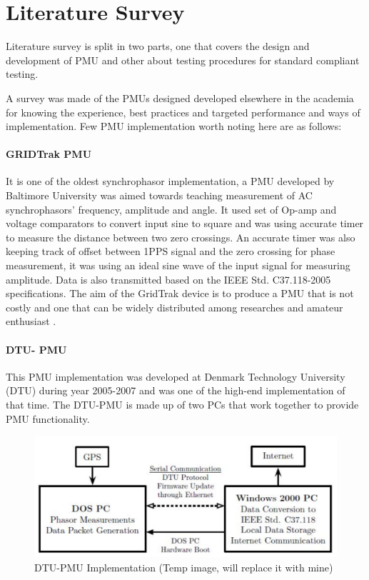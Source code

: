 \chapter{Literature Survey}
Literature survey is split in two parts, one that covers the design and development of PMU  and other about testing procedures for standard compliant testing.

A survey was made of the PMUs designed developed elsewhere in the academia for knowing the experience, best practices and targeted performance and ways of implementation. Few PMU implementation worth noting here are as follows:

\subsubsection{GRIDTrak PMU} It is one of the oldest synchrophasor implementation, a PMU developed by Baltimore University \cite{dotta2014teaching} was aimed towards teaching measurement of AC synchrophasors' frequency, amplitude and angle. It used set of Op-amp and voltage comparators to convert input sine to square and was using accurate timer to measure the distance between two zero crossings. An accurate timer was also keeping track of offset between 1PPS signal and the zero crossing for phase measurement, it was using an ideal sine wave of the input signal for measuring amplitude. Data is also transmitted based on the IEEE Std. C37.118-2005 specifications. The aim of the GridTrak device is to produce a PMU that is not costly and one that can be widely distributed among researches and amateur enthusiast \cite{stadlin2013gridtrak}.

\subsubsection{DTU- PMU}
This PMU implementation was developed at Denmark Technology University (DTU) during year 2005-2007 \cite{garcia2010dtu} and was one of the high-end implementation of that time. The DTU-PMU is made up of two PCs that work together to provide PMU functionality.
\begin{figure}
	\centering
	\includegraphics[scale=0.4]{fig/dtu-pmu.png}
	\caption{DTU-PMU Implementation (Temp image, will replace it with mine)}
	\label{fig:dtu-pmu}
\end{figure}

